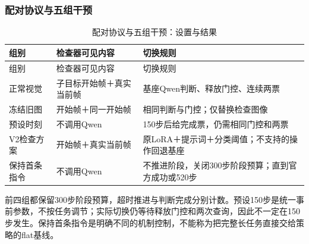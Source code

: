 \subsubsection{配对协议与五组干预}\label{s12-detail-9}

\FloatBarrier\begingroup\small\setlength{\tabcolsep}{2.5pt}
\begin{longtable}[]{@{}
  >{\raggedright\arraybackslash}p{}
  >{\raggedright\arraybackslash}p{}
  >{\raggedright\arraybackslash}p{}@{}}
\caption{配对协议与五组干预：设置与结果}\label{tab:s12-3}\tabularnewline
\toprule\noalign{}
\begin{minipage}[b]{\linewidth}\raggedright
组别
\end{minipage} & \begin{minipage}[b]{\linewidth}\raggedright
检查器可见内容
\end{minipage} & \begin{minipage}[b]{\linewidth}\raggedright
切换规则
\end{minipage} \\
\midrule\noalign{}
\endfirsthead
\toprule\noalign{}
\begin{minipage}[b]{\linewidth}\raggedright
组别
\end{minipage} & \begin{minipage}[b]{\linewidth}\raggedright
检查器可见内容
\end{minipage} & \begin{minipage}[b]{\linewidth}\raggedright
切换规则
\end{minipage} \\
\midrule\noalign{}
\endhead
\bottomrule\noalign{}
\endlastfoot
正常视觉 & 子目标开始帧＋真实当前帧 & 基座Qwen判断、释放门控、连续两票 \\
冻结旧图 & 开始帧＋同一开始帧 & 相同判断与门控；仅替换检查图像 \\
预设时刻 & 不调用Qwen & 150步后给完成票，仍需相同门控和两票 \\
V2检查方案 & 开始帧＋真实当前帧 & 原LoRA＋提示词＋分类阈值；不支持的操作回退基座 \\
保持首条指令 & 不调用Qwen & 不推进阶段，关闭300步阶段预算；直到官方成功或520步 \\
\end{longtable}\endgroup

前四组都保留300步阶段预算，超时推进与判断完成分别计数。预设150步是统一事前参数，不按任务调节；实际切换仍等待释放门控和两次查询，因此不一定在150步发生。保持首条指令是明确不同的机制控制，不能称为把完整长任务直接交给策略的flat基线。

